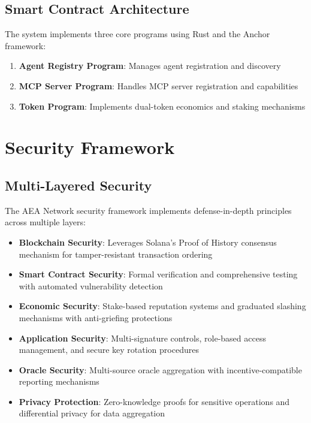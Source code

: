 \documentclass[12pt,a4paper]{article}
\begin{document}
\subsection{Smart Contract Architecture}

The system implements three core programs using Rust and the Anchor framework:

\begin{enumerate}
\item \textbf{Agent Registry Program}: Manages agent registration and discovery
\item \textbf{MCP Server Program}: Handles MCP server registration and capabilities
\item \textbf{Token Program}: Implements dual-token economics and staking mechanisms
\end{enumerate}

\section{Security Framework}

\subsection{Multi-Layered Security}

The AEA Network security framework implements defense-in-depth principles across multiple layers:

\begin{itemize}
\item \textbf{Blockchain Security}: Leverages Solana's Proof of History consensus mechanism for tamper-resistant transaction ordering
\item \textbf{Smart Contract Security}: Formal verification and comprehensive testing with automated vulnerability detection
\item \textbf{Economic Security}: Stake-based reputation systems and graduated slashing mechanisms with anti-griefing protections
\item \textbf{Application Security}: Multi-signature controls, role-based access management, and secure key rotation procedures
\item \textbf{Oracle Security}: Multi-source oracle aggregation with incentive-compatible reporting mechanisms
\item \textbf{Privacy Protection}: Zero-knowledge proofs for sensitive operations and differential privacy for data aggregation
\end{itemize}
\end{document}
